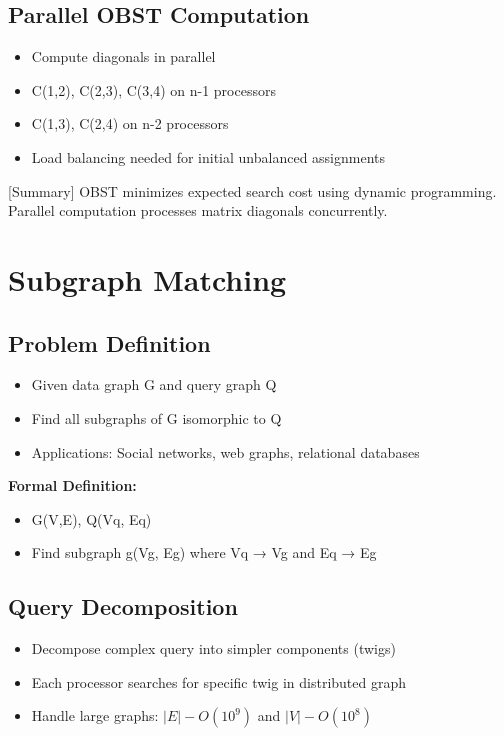 \documentclass[12pt]{article}
\begin{document}
\subsection{Parallel OBST Computation}

\begin{itemize}
    \item Compute diagonals in parallel
    \item C(1,2), C(2,3), C(3,4) on n-1 processors
    \item C(1,3), C(2,4) on n-2 processors
    \item Load balancing needed for initial unbalanced assignments
\end{itemize}

[Summary] OBST minimizes expected search cost using dynamic programming. Parallel computation processes matrix diagonals concurrently.

\section{Subgraph Matching}

\subsection{Problem Definition}

\begin{itemize}
    \item Given data graph G and query graph Q
    \item Find all subgraphs of G isomorphic to Q
    \item Applications: Social networks, web graphs, relational databases
\end{itemize}

\textbf{Formal Definition:}
\begin{itemize}
    \item G(V,E), Q(Vq, Eq)
    \item Find subgraph g(Vg, Eg) where Vq → Vg and Eq → Eg
\end{itemize}

\subsection{Query Decomposition}

\begin{itemize}
    \item Decompose complex query into simpler components (twigs)
    \item Each processor searches for specific twig in distributed graph
    \item Handle large graphs: $|E| - O(10^9)$ and $|V| - O(10^8)$
\end{itemize}
\end{document}
